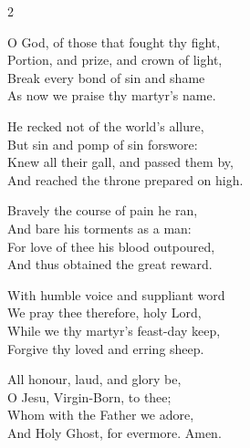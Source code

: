 \begin{multicols}{2}
\raggedcolumns
\begin{enpars}
O God, of those that fought thy fight,\\
Portion, and prize, and crown of light,\\
Break every bond of sin and shame\\
As now we praise thy martyr's name.

He recked not of the world's allure,\\
But sin and pomp of sin forswore:\\
Knew all their gall, and passed them by,\\
And reached the throne prepared on high.

Bravely the course of pain he ran,\\
And bare his torments as a man:\\
For love of thee his blood outpoured,\\
And thus obtained the great reward.

With humble voice and suppliant word\\
We pray thee therefore, holy Lord,\\
While we thy martyr's feast-day keep,\\
Forgive thy loved and erring sheep.

All honour, laud, and glory be,\\
O Jesu, Virgin-Born, to thee;\\
Whom with the Father we adore,\\
And Holy Ghost, for evermore.
Amen.
\end{enpars}\end{multicols}